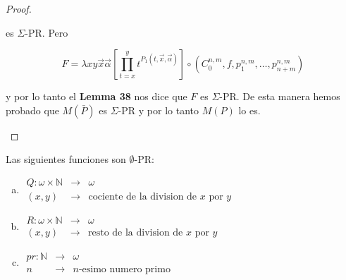 \begin{proof}
\begin{enumerate}[a)]
        \par es $\Sigma$-PR. Pero

        \[
          F = \lambda xy\vec{x}\vec{\alpha}\left[\prod_{t=x}^{y}t^{P_{1}(t,\vec{x},\vec{\alpha})}\right] \circ
          (C_{0}^{n,m},f,p_{1}^{n,m},\dotsc,p_{n+m}^{n,m})
        \]

        \par y por lo tanto el \textbf{Lemma 38} nos dice que $F$ es $\Sigma$-PR. De esta manera hemos probado que
        $M(\bar{P})$ es $\Sigma$-PR y por lo tanto $M(P)$ lo es.
    \end{enumerate}
  \end{proof}

  \begin{lemma}
    \par Las siguientes funciones son $\emptyset$-PR:

    \begin{enumerate}[a)]
      \item
        $\begin{array}{rll}
          Q: \omega \times \mathbb{N} &\rightarrow& \omega \\
          (x,y) & \rightarrow & \text{cociente de la division de } x \text{ por } y
        \end{array}$
      \item
        $\begin{array}{rll}
          R: \omega \times \mathbb{N} &\rightarrow& \omega \\
          (x,y) &\rightarrow& \text{resto de la division de } x \text{ por } y
        \end{array}$
      \item
        $\begin{array}{rll}
          pr: \mathbb{N} &\rightarrow& \omega \\
          n & \rightarrow & n\text{-esimo numero primo}
        \end{array}$
    \end{enumerate}
  \end{lemma}
